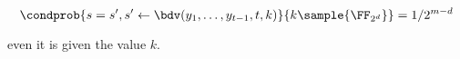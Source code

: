\documentclass[envcountsame,runningheads,notitlepage]{llncs}
\begin{document}
	\begin{equation*}
		\condprob{s = s', s' \leftarrow \bdv(y_1, \ldots, y_{t-1}, t, k)}{k \sample {\FF_{2^d}}} = 1/2^{m-d}
	\end{equation*}
	
	even it is given the value $k$.
	
	
	\ifnum{}
	
	\else
	
	\fi
	
	
\end{document}
